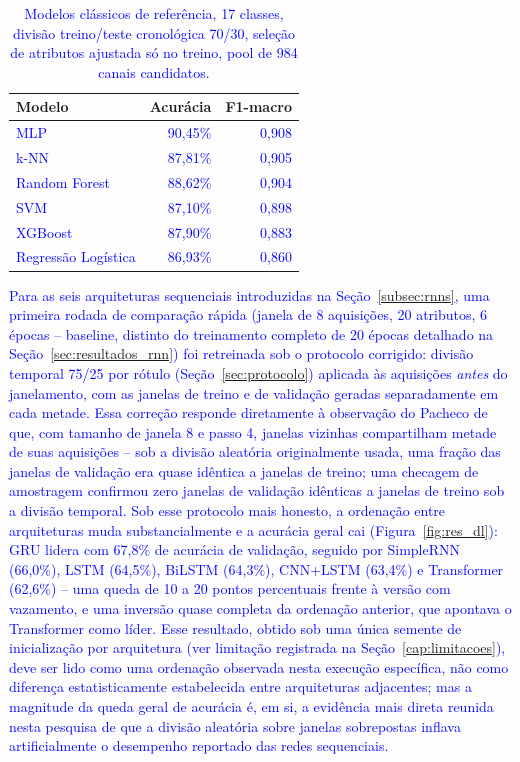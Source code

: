 \documentclass[times,final]{elsarticle}
\begin{document}
\begin{table}[H]
    \centering
    \caption{\textcolor{blue}{Modelos clássicos de referência, 17 classes, divisão treino/teste cronológica 70/30, seleção de atributos ajustada só no treino, pool de 984 canais candidatos.}}
    \label{tab:res_classical}
    \begin{tabular}{@{}lrr@{}}
        \toprule
        \textbf{Modelo} & \textbf{Acurácia} & \textbf{F1-macro} \\
        \midrule
        \textcolor{blue}{MLP} & \textcolor{blue}{90,45\%} & \textcolor{blue}{0,908} \\
        \textcolor{blue}{k-NN} & \textcolor{blue}{87,81\%} & \textcolor{blue}{0,905} \\
        \textcolor{blue}{Random Forest} & \textcolor{blue}{88,62\%} & \textcolor{blue}{0,904} \\
        \textcolor{blue}{SVM} & \textcolor{blue}{87,10\%} & \textcolor{blue}{0,898} \\
        \textcolor{blue}{XGBoost} & \textcolor{blue}{87,90\%} & \textcolor{blue}{0,883} \\
        \textcolor{blue}{Regressão Logística} & \textcolor{blue}{86,93\%} & \textcolor{blue}{0,860} \\
        \bottomrule
    \end{tabular}
\end{table}

\textcolor{blue}{Para as seis arquiteturas sequenciais introduzidas na Seção~\ref{subsec:rnns}, uma primeira rodada de comparação rápida (janela de 8 aquisições, 20 atributos, 6 épocas -- baseline, distinto do treinamento completo de 20 épocas detalhado na Seção~\ref{sec:resultados_rnn}) foi retreinada sob o protocolo corrigido: divisão temporal 75/25 por rótulo (Seção~\ref{sec:protocolo}) aplicada às aquisições \emph{antes} do janelamento, com as janelas de treino e de validação geradas separadamente em cada metade. Essa correção responde diretamente à observação do Pacheco de que, com tamanho de janela 8 e passo 4, janelas vizinhas compartilham metade de suas aquisições -- sob a divisão aleatória originalmente usada, uma fração das janelas de validação era quase idêntica a janelas de treino; uma checagem de amostragem confirmou zero janelas de validação idênticas a janelas de treino sob a divisão temporal. Sob esse protocolo mais honesto, a ordenação entre arquiteturas muda substancialmente e a acurácia geral cai (Figura~\ref{fig:res_dl}): GRU lidera com 67,8\% de acurácia de validação, seguido por SimpleRNN (66,0\%), LSTM (64,5\%), BiLSTM (64,3\%), CNN+LSTM (63,4\%) e Transformer (62,6\%) -- uma queda de 10 a 20 pontos percentuais frente à versão com vazamento, e uma inversão quase completa da ordenação anterior, que apontava o Transformer como líder. Esse resultado, obtido sob uma única semente de inicialização por arquitetura (ver limitação registrada na Seção~\ref{cap:limitacoes}), deve ser lido como uma ordenação observada nesta execução específica, não como diferença estatisticamente estabelecida entre arquiteturas adjacentes; mas a magnitude da queda geral de acurácia é, em si, a evidência mais direta reunida nesta pesquisa de que a divisão aleatória sobre janelas sobrepostas inflava artificialmente o desempenho reportado das redes sequenciais.}
\end{document}
